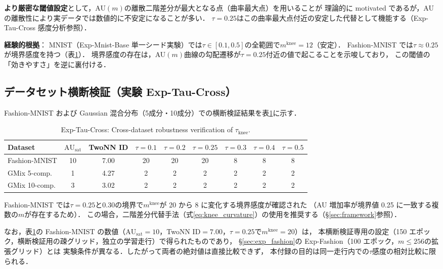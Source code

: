 \documentclass[11pt,a4paper]{jsarticle}
\newcommand{\AUsat}{\mathrm{AU}_{\mathrm{sat}}}
\newcommand{\mknee}{m^{\mathrm{knee}}}
\begin{document}
\textbf{より厳密な閾値設定}として，AU$(m)$の離散二階差分が最大となる点（曲率最大点）を用いることが
理論的に motivated であるが，AU の離散性により実データでは数値的に不安定になることが多い．
$\tau = 0.25$はこの曲率最大点付近の安定した代替として機能する（Exp-Tau-Cross 感度分析参照）．

\textbf{経験的根拠}：
MNIST（Exp-Mnist-Base 単一シード実験）では$\tau \in [0.1, 0.5]$の全範囲で$\mknee = 12$（安定）．
Fashion-MNIST では$\tau \approx 0.25$が境界感度を持つ（表\ref{tab:ez}）．
境界感度の存在は，AU$(m)$曲線の勾配遷移が$\tau = 0.25$付近の値で起こることを示唆しており，
この閾値の「効きやすさ」を逆に裏付ける．

\subsection*{データセット横断検証（実験 Exp-Tau-Cross）}

Fashion-MNIST および Gaussian 混合分布（5成分・10成分）での横断検証結果を表\ref{tab:ez}に示す．

\begin{table}[H]
\centering
\caption{Exp-Tau-Cross: Cross-dataset robustness verification of $\tau_{\mathrm{knee}}$.}
\label{tab:ez}
\small
\begin{tabular}{lcc|cccccc}
\toprule
Dataset & $\AUsat$ & TwoNN ID & $\tau=0.1$ & $\tau=0.2$ & $\tau=0.25$ & $\tau=0.3$ & $\tau=0.4$ & $\tau=0.5$ \\
\midrule
Fashion-MNIST & 10 & 7.00 & 20 & 20 & 20 & 8 & 8 & 8 \\
GMix 5-comp. & 1 & 4.27 & 2 & 2 & 2 & 2 & 2 & 2 \\
GMix 10-comp. & 3 & 3.02 & 2 & 2 & 2 & 2 & 2 & 2 \\
\bottomrule
\end{tabular}
\end{table}

Fashion-MNIST では$\tau = 0.25$と$0.30$の境界で$\mknee$が 20 から 8 に変化する境界感度が確認された
（AU 増加率が境界値 0.25 に一致する複数の$m$が存在するため）．
この場合，二階差分代替手法（式\eqref{eq:knee_curvature}）の使用を推奨する（§\ref{sec:framework}参照）．

なお，表\ref{tab:ez}の Fashion-MNIST の数値（$\AUsat = 10$，TwoNN ID$=7.00$，$\tau=0.25$で$\mknee = 20$）は，
本横断検証専用の設定（150 エポック，横断検証用の疎グリッド，独立の学習走行）で得られたものであり，
§\ref{sec:exp_fashion}の Exp-Fashion（100 エポック，$m \leq 256$の拡張グリッド）とは
実験条件が異なる．したがって両者の絶対値は直接比較できず，
本付録の目的は同一走行内での$\tau$感度の相対比較に限られる．
\end{document}

